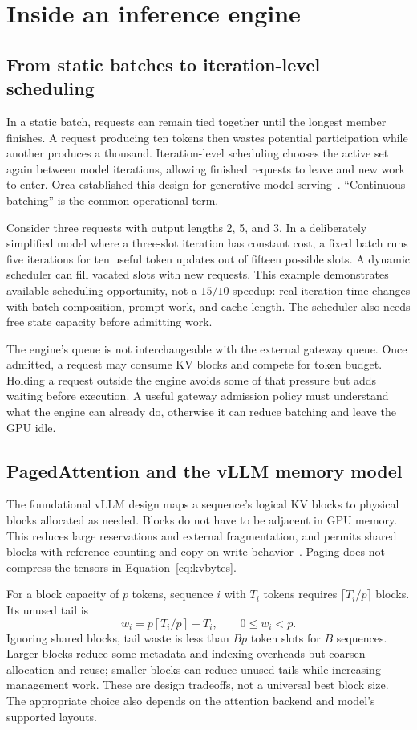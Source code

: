 \section{Inside an inference engine}
\label{sec:engines}
\subsection{From static batches to iteration-level scheduling}
In a static batch, requests can remain tied together until the longest member
finishes. A request producing ten tokens then wastes potential participation
while another produces a thousand. Iteration-level scheduling chooses the active
set again between model iterations, allowing finished requests to leave and
new work to enter. Orca established this design for generative-model
serving~\cite{orca}. ``Continuous batching'' is the common operational term.

Consider three requests with output lengths 2, 5, and 3. In a deliberately
simplified model where a three-slot iteration has constant cost, a fixed batch
runs five iterations for ten useful token updates out of fifteen possible
slots. A dynamic scheduler can fill vacated slots with new requests. This
example demonstrates available scheduling opportunity, not a $15/10$ speedup:
real iteration time changes with batch composition, prompt work, and cache
length. The scheduler also needs free state capacity before admitting work.

The engine's queue is not interchangeable with the external gateway queue.
Once admitted, a request may consume KV blocks and compete for token budget.
Holding a request outside the engine avoids some of that pressure but adds
waiting before execution. A useful gateway admission policy must understand
what the engine can already do, otherwise it can reduce batching and leave the
GPU idle.

\subsection{PagedAttention and the vLLM memory model}
The foundational vLLM design maps a sequence's logical KV blocks to physical
blocks allocated as needed. Blocks do not have to be adjacent in GPU memory.
This reduces large reservations and external fragmentation, and permits shared
blocks with reference counting and copy-on-write behavior~\cite{paged}.
Paging does not compress the tensors in Equation~\ref{eq:kvbytes}.

For a block capacity of $p$ tokens, sequence $i$ with $T_i$ tokens requires
$\lceil T_i/p\rceil$ blocks. Its unused tail is
\begin{equation}
 w_i=p\left\lceil T_i/p\right\rceil-T_i,\qquad 0\le w_i<p.
\end{equation}
Ignoring shared blocks, tail waste is less than $Bp$ token slots for $B$
sequences. Larger blocks reduce some metadata and indexing overheads but
coarsen allocation and reuse; smaller blocks can reduce unused tails while
increasing management work. These are design tradeoffs, not a universal best
block size. The appropriate choice also depends on the attention backend and
model's supported layouts.

